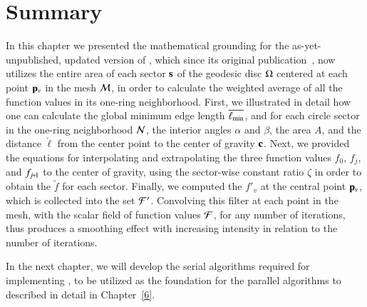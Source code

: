 \section{Summary}
\label{ch4sS}
In this chapter we presented the mathematical grounding for the as-yet-unpublished, updated version of , which since its original publication~\cite[s.~3.2]{Mara17}, now utilizes the entire area of each sector $\mathbf{s}$ of the geodesic disc $\Omega$ centered at each point $\mathbf{p}_v$ in the mesh $\mathcal{M}$, in order to calculate the weighted average of all the function values in its one-ring neighborhood. First, we illustrated in detail how one can calculate the global minimum edge length $\overline{\ell_\text{min}}$, and for each circle sector in the one-ring neighborhood $\mathcal{N}$, the interior angles $\alpha$ and $\beta$, the area $A$, and the distance $\check{\ell}$ from the center point to the center of gravity $\mathbf{c}$. Next, we provided the equations for interpolating and extrapolating the three function values $f_0$, $f_j$, and $f_{\sjpo}$ to the center of gravity, using the sector-wise constant ratio $\zeta$ in order to obtain the \wmfv{} $\tilde{f}$ for each sector. Finally, we computed the \wmfv{} $f'_v$ at the central point $\mathbf{p}_v$, which is collected into the set $\mathcal{F}'$. Convolving this filter at each point in the mesh, with the scalar field of function values $\mathcal{F}$, for any number of iterations, thus produces a smoothing effect with increasing intensity in relation to the number of iterations.

In the next chapter, we will develop the serial algorithms required for implementing , to be utilized as the foundation for the parallel algorithms to described in detail in Chapter~\ref{6}.
